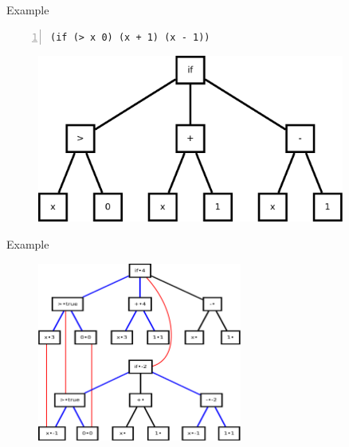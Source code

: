 \documentclass[presentation]{beamer}\mode<presentation>{\usetheme{sapere}}
\begin{document}
\begin{frame}[fragile]{Example}
    \begin{lstlisting}[mathescape,morekeywords={rep,mux,sense,inf,def,min,hood,nbr,nbr,range,else,if,Infinity},numbers=left,basicstyle=\ttfamily]
(if (> x 0) (x + 1) (x - 1))
    \end{lstlisting}
  \centering
  \begin{figure}
    \includegraphics[width=0.9\textwidth]{imgs/ast} 
  \end{figure}
\end{frame}

\begin{frame}[fragile]{Example}
  \centering
  \begin{figure}
    \includegraphics[width=0.6\textwidth]{imgs/trees} 
  \end{figure}
\end{frame}
\end{document}
